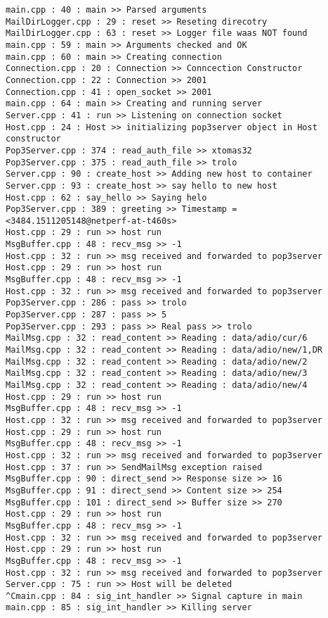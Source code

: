 \documentclass[a4paper, 11pt]{article}
\begin{document}
	\begin{lstlisting}
main.cpp : 40 : main >> Parsed arguments
MailDirLogger.cpp : 29 : reset >> Reseting direcotry
MailDirLogger.cpp : 63 : reset >> Logger file waas NOT found
main.cpp : 59 : main >> Arguments checked and OK
main.cpp : 60 : main >> Creating connection
Connection.cpp : 20 : Connection >> Conncection Constructor
Connection.cpp : 22 : Connection >> 2001
Connection.cpp : 41 : open_socket >> 2001
main.cpp : 64 : main >> Creating and running server
Server.cpp : 41 : run >> Listening on connection socket
Host.cpp : 24 : Host >> initializing pop3server object in Host constructor
Pop3Server.cpp : 374 : read_auth_file >> xtomas32
Pop3Server.cpp : 375 : read_auth_file >> trolo
Server.cpp : 90 : create_host >> Adding new host to container
Server.cpp : 93 : create_host >> say hello to new host
Host.cpp : 62 : say_hello >> Saying helo
Pop3Server.cpp : 389 : greeting >> Timestamp = <3484.1511205148@netperf-at-t460s>
Host.cpp : 29 : run >> host run
MsgBuffer.cpp : 48 : recv_msg >> -1
Host.cpp : 32 : run >> msg received and forwarded to pop3server
Host.cpp : 29 : run >> host run
MsgBuffer.cpp : 48 : recv_msg >> -1
Host.cpp : 32 : run >> msg received and forwarded to pop3server
Pop3Server.cpp : 286 : pass >> trolo
Pop3Server.cpp : 287 : pass >> 5
Pop3Server.cpp : 293 : pass >> Real pass >> trolo
MailMsg.cpp : 32 : read_content >> Reading : data/adio/cur/6
MailMsg.cpp : 32 : read_content >> Reading : data/adio/new/1,DR
MailMsg.cpp : 32 : read_content >> Reading : data/adio/new/2
MailMsg.cpp : 32 : read_content >> Reading : data/adio/new/3
MailMsg.cpp : 32 : read_content >> Reading : data/adio/new/4
Host.cpp : 29 : run >> host run
MsgBuffer.cpp : 48 : recv_msg >> -1
Host.cpp : 32 : run >> msg received and forwarded to pop3server
Host.cpp : 29 : run >> host run
MsgBuffer.cpp : 48 : recv_msg >> -1
Host.cpp : 32 : run >> msg received and forwarded to pop3server
Host.cpp : 37 : run >> SendMailMsg exception raised
MsgBuffer.cpp : 90 : direct_send >> Response size >> 16
MsgBuffer.cpp : 91 : direct_send >> Content size >> 254
MsgBuffer.cpp : 101 : direct_send >> Buffer size >> 270
Host.cpp : 29 : run >> host run
MsgBuffer.cpp : 48 : recv_msg >> -1
Host.cpp : 32 : run >> msg received and forwarded to pop3server
Host.cpp : 29 : run >> host run
MsgBuffer.cpp : 48 : recv_msg >> -1
Host.cpp : 32 : run >> msg received and forwarded to pop3server
Server.cpp : 75 : run >> Host will be deleted
^Cmain.cpp : 84 : sig_int_handler >> Signal capture in main
main.cpp : 85 : sig_int_handler >> Killing server

	\end{lstlisting}
\end{document}
